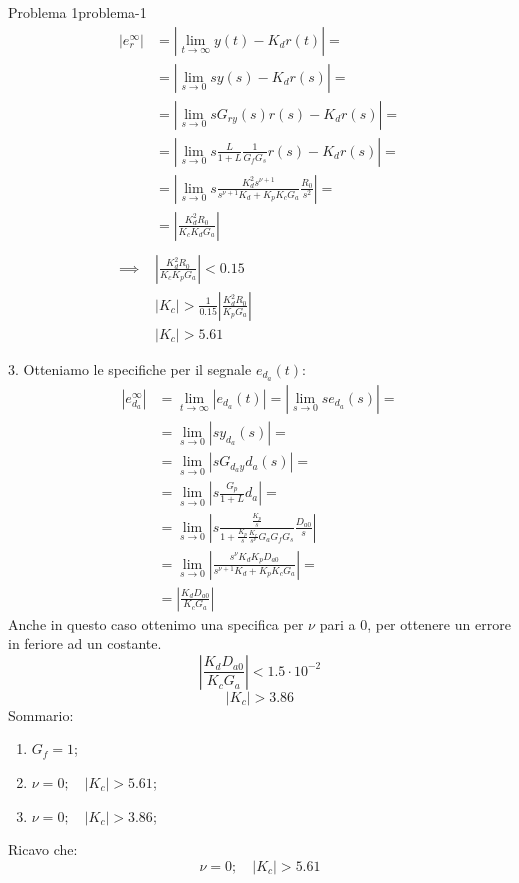 \documentclass[12pt]{article}
\begin{document}
\begin{problem}{Problema 1}{problema-1}
    \begin{align*}
        \left| e_r^{\infty} \right| & = \left|\lim_{t \to \infty}  y(t) - K_dr(t) \right| = \\
        & = |\lim_{s \to 0} sy(s) - K_dr(s)| = \\
        & = |\lim_{s \to 0} sG _{ry}(s)r(s) - K_dr(s)| = \\
        & = \left|\lim_{s \to 0} s \frac{L}{1+L} \frac{1}{G_fG_s} r(s) - K_dr(s) \right| = \\
        & = \left|\lim_{s \to 0} s \frac{K_d^{2}s^{\nu + 1}}{s^{\nu + 1}K_d + K_pK_cG_a } \frac{R_0}{s^{2}} \right| = \\
        & = \left| \frac{K_d^{2}R_0}{K_cK_dG_a}  \right|  \\
        \\
        \implies & \left| \frac{K_d^{2} R_0}{ K_c K_p G_a} \right|  < 0.15 \\
        & \left| K_c \right| > \frac{1}{0.15} \left| \frac{K_d^{2} R_0}{ K_p G_a} \right|  \\
        & \left| K_c \right|  > 5.61 
    \end{align*}

    3. Otteniamo le specifiche per il segnale $e _{d_a}(t)$:
    \begin{align*}
        \left| e _{d_a}^{\infty} \right| & = \lim_{t \to \infty} |e _{d_a}(t)| =| \lim_{s \to 0}  s e _{d_a}(s)| = \\
        & = \lim_{s \to 0}  |s y _{d_a}(s)| = \\
        & = \lim_{s \to 0} | s G _{d_ay} d_a(s) | = \\
        & = \lim_{s \to 0} \left| s \frac{G_p}{1 + L} d_a  \right|  = \\
        & = \lim_{s \to 0} \left|  s \frac{\frac{K_p}{s} }{1  +\frac{K_p}{s} \frac{K_c}{s^{\nu}} G_aG_fG_s } \frac{D_{a0}}{s}  \right| \\
        & = \lim_{s \to 0} \left|  \frac{s^{\nu}K_dK_pD_{a0}}{s^{\nu+1}K_d + K_pK_cG_a} \right| = \\
        & = \left| \frac{K_dD _{a0}}{K_cG_a}  \right| 
    \end{align*} 
    Anche in questo caso ottenimo una specifica per $\nu$ pari a 0, per ottenere un errore in feriore ad un costante.
    \[ \left|  \frac{K_d D _{a0}}{K_cG_a} \right| < 1.5 \cdot 10^{-2} \]
    \[ \left| K_c \right|  > 3.86 \]
    Sommario:
    \begin{enumerate}
        \item $G_f = 1$;
        \item $\nu = 0;\quad |K_c| > 5.61$;
        \item $\nu = 0;\quad |K_c| > 3.86$;
    \end{enumerate}
    Ricavo che:
    \[ \boxed{\nu = 0;\quad |K_c| > 5.61} \]
    
\end{problem}
\end{document}
